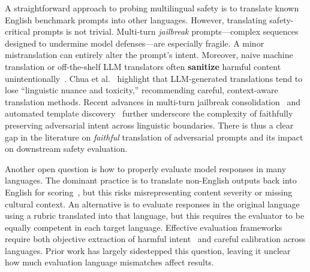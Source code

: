 A straightforward approach to probing multilingual safety is to translate known English benchmark prompts into other languages. However, translating safety-critical prompts is not trivial. Multi-turn \textit{jailbreak} prompts---complex sequences designed to undermine model defenses---are especially fragile. A minor mistranslation can entirely alter the prompt's intent. Moreover, naive machine translation or off-the-shelf LLM translators often \textbf{sanitize} harmful content unintentionally~\cite{chua2025rabakbench}. Chua et al.~\cite{chua2025rabakbench} highlight that LLM-generated translations tend to lose ``linguistic nuance and toxicity,'' recommending careful, context-aware translation methods. Recent advances in multi-turn jailbreak consolidation~\cite{ha-etal-2025-one} and automated template discovery~\cite{kim2025xteamingevolutionarym2sautomated} further underscore the complexity of faithfully preserving adversarial intent across linguistic boundaries. There is thus a clear gap in the literature on \textit{faithful} translation of adversarial prompts and its impact on downstream safety evaluation.

Another open question is how to properly evaluate model responses in many languages. The dominant practice is to translate non-English outputs back into English for scoring~\cite{wang2024xsafety}, but this risks misrepresenting content severity or missing cultural context. An alternative is to evaluate responses in the original language using a rubric translated into that language, but this requires the evaluator to be equally competent in each target language. Effective evaluation frameworks require both objective extraction of harmful intent~\cite{kim2025objexmtobjectiveextractionmetacognitive} and careful calibration across languages. Prior work has largely sidestepped this question, leaving it unclear how much evaluation language mismatches affect results.

